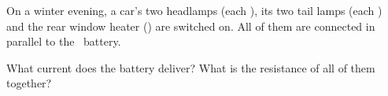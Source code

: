 On a winter evening, a car's two headlamps (each \RhO), its two tail lamps (each \RtO) and the rear window heater (\RwO) are switched on. All of them are connected in parallel to the \VO\ battery.

\begin{abcliste}
\abc What current does the battery deliver?
\abc What is the resistance of all of them together?
\end{abcliste}
